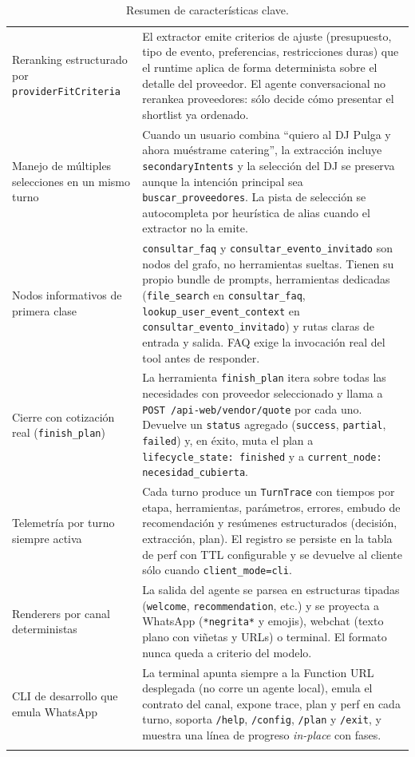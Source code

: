 \documentclass[11pt,a4paper]{article}
\begin{document}
\begin{longtable}{p{4.6cm}p{10.8cm}}
Reranking estructurado por \texttt{providerFitCriteria} &
El extractor emite criterios de ajuste (presupuesto, tipo de evento,
preferencias, restricciones duras) que el runtime aplica de forma
determinista sobre el detalle del proveedor. El agente conversacional
no rerankea proveedores: sólo decide cómo presentar el shortlist ya
ordenado. \\

Manejo de múltiples selecciones en un mismo turno &
Cuando un usuario combina ``quiero al DJ Pulga y ahora muéstrame
catering'', la extracción incluye \texttt{secondaryIntents} y la
selección del DJ se preserva aunque la intención principal sea
\texttt{buscar\_proveedores}. La pista de selección se autocompleta
por heurística de alias cuando el extractor no la emite. \\

Nodos informativos de primera clase &
\texttt{consultar\_faq} y \texttt{consultar\_evento\_invitado} son
nodos del grafo, no herramientas sueltas. Tienen su propio bundle de
prompts, herramientas dedicadas (\texttt{file\_search} en
\texttt{consultar\_faq}, \texttt{lookup\_user\_event\_context} en
\texttt{consultar\_evento\_invitado}) y rutas claras de entrada y
salida. FAQ exige la invocación real del tool antes de responder. \\

Cierre con cotización real (\texttt{finish\_plan}) &
La herramienta \texttt{finish\_plan} itera sobre todas las
necesidades con proveedor seleccionado y llama a
\texttt{POST /api-web/vendor/quote} por cada uno. Devuelve un
\texttt{status} agregado (\texttt{success}, \texttt{partial},
\texttt{failed}) y, en éxito, muta el plan a
\texttt{lifecycle\_state: finished} y a
\texttt{current\_node: necesidad\_cubierta}. \\

Telemetría por turno siempre activa &
Cada turno produce un \texttt{TurnTrace} con tiempos por etapa,
herramientas, parámetros, errores, embudo de recomendación y
resúmenes estructurados (decisión, extracción, plan). El registro
se persiste en la tabla de perf con TTL configurable y se devuelve
al cliente sólo cuando \texttt{client\_mode=cli}. \\

Renderers por canal deterministas &
La salida del agente se parsea en estructuras tipadas
(\texttt{welcome}, \texttt{recommendation}, etc.) y se proyecta a
WhatsApp (\texttt{*negrita*} y emojis), webchat (texto plano con
viñetas y URLs) o terminal. El formato nunca queda a criterio del
modelo. \\

CLI de desarrollo que emula WhatsApp &
La terminal apunta siempre a la Function URL desplegada (no corre un
agente local), emula el contrato del canal, expone trace, plan y
perf en cada turno, soporta \texttt{/help}, \texttt{/config},
\texttt{/plan} y \texttt{/exit}, y muestra una línea de progreso
\textit{in-place} con fases. \\

\bottomrule
\caption{Resumen de características clave.}
\end{longtable}
\end{document}
